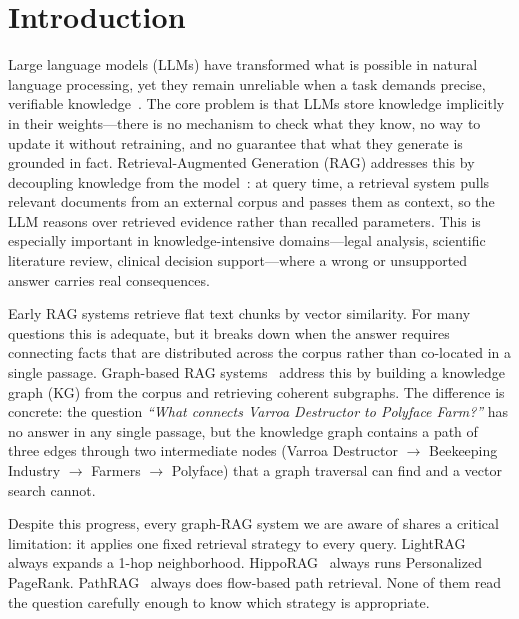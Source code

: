 \section{Introduction}

Large language models (LLMs) have transformed what is possible in natural
language processing, yet they remain unreliable when a task demands precise,
verifiable knowledge~\cite{lewis2020retrieval}. The core problem is that
LLMs store knowledge implicitly in their weights---there is no mechanism to
check what they know, no way to update it without retraining, and no
guarantee that what they generate is grounded in fact.
Retrieval-Augmented Generation (RAG) addresses this by decoupling knowledge
from the model~\cite{gao2023retrieval}: at query time, a retrieval system pulls
relevant documents from an external corpus and passes them as context, so the
LLM reasons over retrieved evidence rather than recalled parameters.
This is especially important in knowledge-intensive domains---legal analysis,
scientific literature review, clinical decision support---where a wrong or
unsupported answer carries real consequences.

Early RAG systems retrieve flat text chunks by vector similarity.
For many questions this is adequate, but it breaks down when the answer
requires connecting facts that are distributed across the corpus rather than
co-located in a single passage.
Graph-based RAG systems~\cite{edge2024graphrag,guo2024lightrag,
gutierrez2024hipporag,chen2025pathrag} address this by building a knowledge
graph (KG) from the corpus and retrieving coherent subgraphs.
The difference is concrete: the question
\textit{``What connects Varroa Destructor to Polyface Farm?''}
has no answer in any single passage, but the knowledge graph contains a
path of three edges through two intermediate nodes (Varroa Destructor
$\to$ Beekeeping Industry $\to$ Farmers $\to$ Polyface) that a graph
traversal can find and a vector search cannot.

Despite this progress, every graph-RAG system we are aware of shares a
critical limitation: it applies one fixed retrieval strategy to every query.
LightRAG~\cite{guo2024lightrag} always expands a 1-hop neighborhood.
HippoRAG~\cite{gutierrez2024hipporag} always runs Personalized PageRank.
PathRAG~\cite{chen2025pathrag} always does flow-based path retrieval.
None of them read the question carefully enough to know which strategy is
appropriate.

